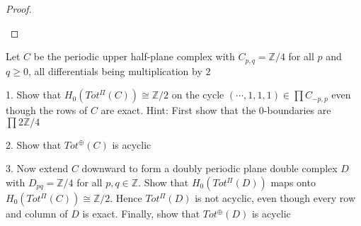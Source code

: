\documentclass{article}
\newenvironment{exercise}[2][Exercise]{\begin{trivlist}
\item[\hskip \labelsep {\bfseries #1}\hskip \labelsep {\bfseries #2.}]}{\end{trivlist}}
\theoremstyle{definition}
\theoremstyle{remark}
\theoremstyle{definition}
\begin{document}
\begin{proof}
\begin{center}
\end{center}
\end{proof}

\begin{exercise}{\textbf{2.7.1}}
Let $C$ be the periodic upper half-plane complex with $C_{p,q}=\mathbb Z/4$ for all $p$ and $q\geq0$, all differentials being multiplication by $2$
\begin{center}
\end{center}
1. Show that $H_0(Tot^\Pi(C))\cong\mathbb Z/2$ on the cycle $(\cdots,1,1,1)\in\prod C_{-p,p}$ even though the rows of $C$ are exact. Hint: First show that the $0$-boundaries are $\prod2\mathbb Z/4$ \par
2. Show that $Tot^\oplus(C)$ is acyclic \par
3. Now extend $C$ downward to form a doubly periodic plane double complex $D$ with $D_{pq}=\mathbb Z/4$ for all $p,q\in\mathbb Z$. Show that $H_0(Tot^\Pi(D))$ maps onto $H_0(Tot^\Pi(C))\cong\mathbb Z/2$. Hence $Tot^\Pi(D)$ is not acyclic, even though every row and column of $D$ is exact. Finally, show that $Tot^\oplus(D)$ is acyclic
\end{exercise}
\end{document}

